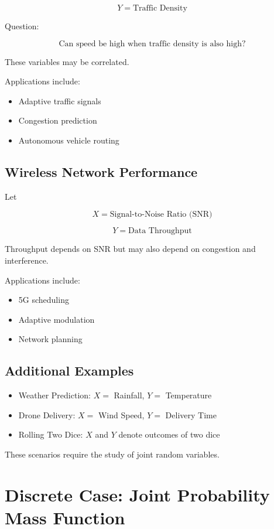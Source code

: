 \documentclass[11pt]{article}
\begin{document}
\[
Y = \text{Traffic Density}
\]

Question:

\[
\text{Can speed be high when traffic density is also high?}
\]

These variables may be correlated.

Applications include:

\begin{itemize}
\item Adaptive traffic signals
\item Congestion prediction
\item Autonomous vehicle routing
\end{itemize}

\subsection{Wireless Network Performance}

Let

\[
X = \text{Signal-to-Noise Ratio (SNR)}
\]

\[
Y = \text{Data Throughput}
\]

Throughput depends on SNR but may also depend on congestion and interference.

Applications include:

\begin{itemize}
\item 5G scheduling
\item Adaptive modulation
\item Network planning
\end{itemize}

\subsection{Additional Examples}

\begin{itemize}
\item Weather Prediction: \(X =\) Rainfall, \(Y =\) Temperature
\item Drone Delivery: \(X =\) Wind Speed, \(Y =\) Delivery Time
\item Rolling Two Dice: \(X\) and \(Y\) denote outcomes of two dice
\end{itemize}

These scenarios require the study of joint random variables.

\section{Discrete Case: Joint Probability Mass Function}
\end{document}
